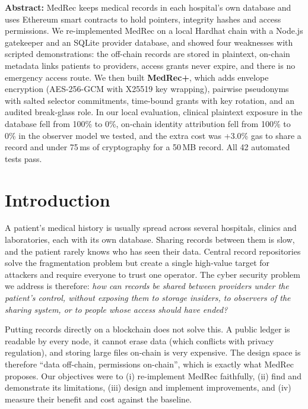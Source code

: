 \documentclass[11pt,a4paper]{article}
\begin{document}
\begin{center}
\begin{minipage}{0.95\linewidth}
\small\textbf{Abstract:}
MedRec keeps medical records in each hospital's own database and uses Ethereum
smart contracts to hold pointers, integrity hashes and access permissions. We
re-implemented MedRec on a local Hardhat chain with a Node.js gatekeeper and an
SQLite provider database, and showed four weaknesses with scripted demonstrations:
the off-chain records are stored in plaintext, on-chain metadata links patients to
providers, access grants never expire, and there is no emergency access route. We
then built \textbf{MedRec+}, which adds envelope encryption (AES-256-GCM with
X25519 key wrapping), pairwise pseudonyms with salted selector commitments,
time-bound grants with key rotation, and an audited break-glass role. In our
local evaluation, clinical plaintext exposure in the database fell from 100\% to
0\%, on-chain identity attribution fell from 100\% to 0\% in the observer model we
tested, and the extra cost was +3.0\% gas to share a record and under 75\,ms of
cryptography for a 50\,MB record. All 42 automated tests pass.
\end{minipage}
\end{center}

\section{Introduction}
A patient's medical history is usually spread across several hospitals, clinics
and laboratories, each with its own database. Sharing records between them is
slow, and the patient rarely knows who has seen their data. Central record
repositories solve the fragmentation problem but create a single high-value target
for attackers and require everyone to trust one operator. The cyber security problem
we address is therefore: \emph{how can records be shared between providers under
the patient's control, without exposing them to storage insiders, to observers of
the sharing system, or to people whose access should have ended?}

Putting records directly on a blockchain does not solve this. A public ledger is
readable by every node, it cannot erase data (which conflicts with privacy
regulation), and storing large files on-chain is very expensive. The design space
is therefore ``data off-chain, permissions on-chain'', which is exactly what MedRec
proposes. Our objectives were to (i) re-implement MedRec faithfully, (ii) find and
demonstrate its limitations, (iii) design and implement improvements, and (iv)
measure their benefit and cost against the baseline.
\end{document}
